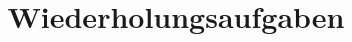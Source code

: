

\subject{Anfängerpraktikum}
\title{Wiederholungsaufgaben}



\maketitle
\thispagestyle{empty}
\tableofcontents
\newpage





\printbibliography{}



